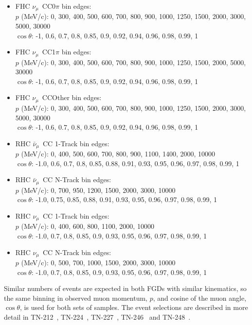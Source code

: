 \begin{itemize}
	\item FHC $\nu_{\mu}$~CC0$\pi$ bin edges: \\
	$p$ (MeV/c): 0, 300, 400, 500, 600, 700, 800, 900, 1000, 1250, 1500, 2000, 3000, 5000, 30000 \\
	$\cos\theta$:  -1, 0.6, 0.7, 0.8, 0.85, 0.9, 0.92, 0.94, 0.96, 0.98, 0.99, 1
	\item FHC $\nu_{\mu}$~CC1$\pi$  bin edges: \\
	$p$ (MeV/c):  0, 300, 400, 500, 600, 700, 800, 900, 1000, 1250, 1500, 2000, 5000, 30000 \\
	$\cos\theta$: -1, 0.6, 0.7, 0.8, 0.85, 0.9, 0.92, 0.94, 0.96, 0.98, 0.99, 1
	\item FHC $\nu_{\mu}$~CCOther bin edges: \\
	$p$ (MeV/c): 0, 300, 400, 500, 600, 700, 800, 900, 1000, 1250, 1500, 2000, 3000, 5000, 30000 \\
	$\cos\theta$:  -1, 0.6, 0.7, 0.8, 0.85, 0.9, 0.92, 0.94, 0.96, 0.98, 0.99, 1
	\item RHC $\bar{\nu}_{\mu}$~CC 1-Track bin edges: \\
	$p$ (MeV/c): 0, 400, 500, 600, 700, 800, 900, 1100, 1400, 2000, 10000 \\
	$\cos\theta$: -1.0, 0.6, 0.7, 0.8, 0.85, 0.88, 0.91, 0.93, 0.95, 0.96, 0.97, 0.98, 0.99, 1
	\item RHC $\bar{\nu}_{\mu}$~CC N-Track bin edges: \\
	$p$ (MeV/c): 0, 700, 950, 1200, 1500, 2000, 3000, 10000 \\
	$\cos\theta$: -1.0, 0.75, 0.85, 0.88, 0.91, 0.93, 0.95, 0.96, 0.97, 0.98, 0.99, 1
	\item RHC $\nu_{\mu}$~CC 1-Track bin edges: \\
	$p$ (MeV/c): 0, 400, 600, 800, 1100, 2000, 10000 \\
	$\cos\theta$: -1.0, 0.7, 0.8, 0.85, 0.9, 0.93, 0.95, 0.96, 0.97, 0.98, 0.99, 1
	\item RHC $\nu_{\mu}$~CC N-Track bin edges: \\
	$p$ (MeV/c): 0, 500, 700, 1000, 1500, 2000, 3000, 10000 \\
	$\cos\theta$: -1.0, 0.7, 0.8, 0.85, 0.9, 0.93, 0.95, 0.96, 0.97, 0.98, 0.99, 1
\end{itemize}

Similar numbers of events are expected in both FGDs with similar kinematics, so the same binning in observed muon momentum, $p$, and cosine of the muon angle, $\cos\theta$, is used for both sets of samples.  The event selections are described in more detail in TN-212~\cite{tn_212}, TN-224~\cite{tn_224}, TN-227~\cite{tn_227}, TN-246~\cite{tn_246} and TN-248~\cite{tn_248}.

